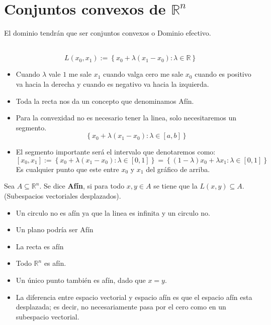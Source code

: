 \section{Conjuntos convexos de \boldmath $\mathbb{R}^n$}

El dominio tendrán que ser conjuntos convexos o Dominio efectivo.

\begin{def.}[Lineal]\,\\ 
$$L(x_0,x_1) := \left\{x_0+\lambda(x_1-x_0):\lambda \in \mathbb{R}\right\}$$
\begin{center}
\end{center}
\end{def.}

\begin{itemize}
    \item Cuando $\lambda$ vale $1$ me sale $x_1$ cuando valga cero me sale $x_0$ cuando es positivo va hacia la derecha y cuando es negativo va hacia la izquierda.
    \item Toda la recta nos da un concepto que denominamos Afín. 
    \item Para la convexidad no es necesario tener la linea, solo necesitaremos un segmento. 
	$$\left\{x_0+\lambda(x_1-x_0):\lambda \in \left[a,b\right]\right\}$$
    \item El segmento importante será el intervalo que denotaremos como:
	$$\left[x_0,x_1\right]:=\left\{x_0+\lambda(x_1-x_0):\lambda \in \left[0,1\right]\right\}=\left\{(1-\lambda)x_0+\lambda x_1:\lambda \in \left[0,1\right]\right\}$$
	Es cualquier punto que este entre $x_0$ y $x_1$ del gráfico de arriba. 
\end{itemize}


\begin{def.}
    Sea $A\subseteq \mathbb{R}^n$. Se dice \textbf{Afín}, si para todo $x, y\in A$ se tiene que la $L(x,y)\subseteq A$. (Subespacios vectoriales desplazados).
\end{def.}

\begin{itemize}
    \item Un circulo no es afín ya que la linea es infinita y un circulo no.
    \item Un plano podría ser Afín
    \item La recta es afín
    \item Todo $\mathbb{R}^n$ es afín.
    \item Un único punto también es afín, dado que $x=y$.
    \item La diferencia entre espacio vectorial y espacio afín es que el espacio afín esta desplazada; es decir, no necesariamente pasa por el cero como en un subespacio vectorial.
\end{itemize}

